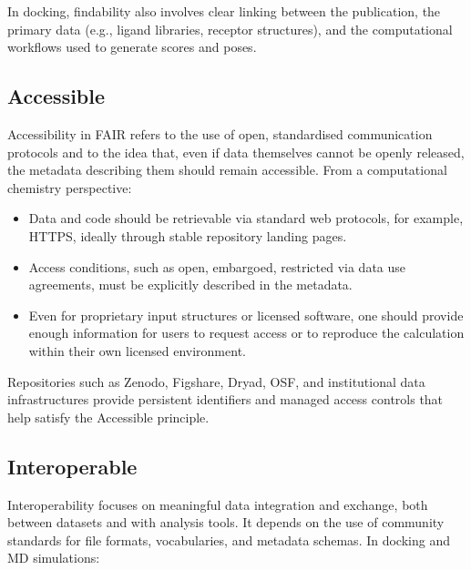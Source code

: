 \documentclass[12pt]{article}
\begin{document}
In docking, findability also involves clear linking between the publication, the primary data (e.g., ligand libraries, receptor structures), and the computational workflows used to generate scores and poses\cite{CH12_plos2025tenDocking,CH12_rigorRepro2020}.

\subsection{Accessible}

Accessibility in FAIR refers to the use of open, standardised communication protocols and to the idea that, even if data themselves cannot be openly released, the metadata describing them should remain accessible\cite{CH12_goFairPrinciples,CH12_nnlmFAIR}. From a computational chemistry perspective:

\begin{itemize}
  \item Data and code should be retrievable via standard web protocols, for example, HTTPS, ideally through stable repository landing pages.
  \item Access conditions, such as open, embargoed, restricted via data use agreements, must be explicitly described in the metadata.
  \item Even for proprietary input structures or licensed software, one should provide enough information for users to request access or to reproduce the calculation within their own licensed environment\cite{CH12_goFairPrinciples,CH12_nnlmFAIR,CH12_rigorRepro2020}.
\end{itemize}

Repositories such as Zenodo\cite{CH12_sicilia2017community}, Figshare\cite{CH12_thelwall2016figshare}, Dryad\cite{CH12_miller2016making}, OSF\cite{CH12_foster2017open}, and institutional data infrastructures\cite{CH12_uTexasRepos,CH12_aguRepos,CH12_snsfRepos} provide persistent identifiers and managed access controls that help satisfy the Accessible principle.

\subsection{Interoperable}

Interoperability focuses on meaningful data integration and exchange, both between datasets and with analysis tools. It depends on the use of community standards for file formats, vocabularies, and metadata schemas\cite{CH12_wilkinson2016FAIR,CH12_goFairPrinciples,CH12_helpingFAIR2019}. In docking and MD simulations:
\end{document}
